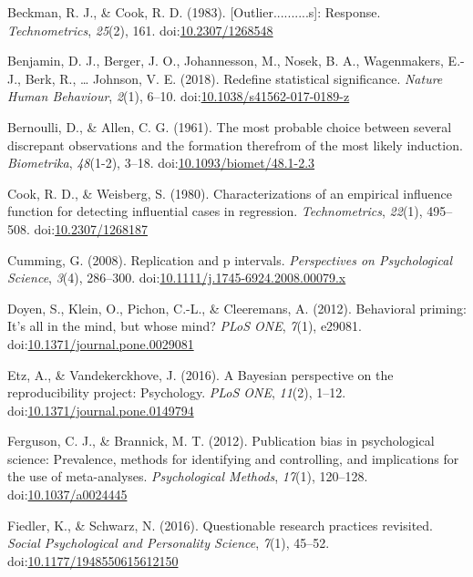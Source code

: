 \documentclass[english,man]{apa6}
\theoremstyle{definition}
\theoremstyle{definition}
\theoremstyle{definition}
\theoremstyle{remark}
\begin{document}
\hypertarget{ref-Beckman1983}{}
Beckman, R. J., \& Cook, R. D. (1983). {[}Outlier..........s{]}:
Response. \emph{Technometrics}, \emph{25}(2), 161.
doi:\href{https://doi.org/10.2307/1268548}{10.2307/1268548}

\hypertarget{ref-Benjamin2018}{}
Benjamin, D. J., Berger, J. O., Johannesson, M., Nosek, B. A.,
Wagenmakers, E.-J., Berk, R., \ldots{} Johnson, V. E. (2018). Redefine
statistical significance. \emph{Nature Human Behaviour}, \emph{2}(1),
6--10.
doi:\href{https://doi.org/10.1038/s41562-017-0189-z}{10.1038/s41562-017-0189-z}

\hypertarget{ref-Bernoulli1777}{}
Bernoulli, D., \& Allen, C. G. (1961). The most probable choice between
several discrepant observations and the formation therefrom of the most
likely induction. \emph{Biometrika}, \emph{48}(1-2), 3--18.
doi:\href{https://doi.org/10.1093/biomet/48.1-2.3}{10.1093/biomet/48.1-2.3}

\hypertarget{ref-Cook1980}{}
Cook, R. D., \& Weisberg, S. (1980). Characterizations of an empirical
influence function for detecting influential cases in regression.
\emph{Technometrics}, \emph{22}(1), 495--508.
doi:\href{https://doi.org/10.2307/1268187}{10.2307/1268187}

\hypertarget{ref-Cumming2008}{}
Cumming, G. (2008). Replication and p intervals. \emph{Perspectives on
Psychological Science}, \emph{3}(4), 286--300.
doi:\href{https://doi.org/10.1111/j.1745-6924.2008.00079.x}{10.1111/j.1745-6924.2008.00079.x}

\hypertarget{ref-Doyen2012}{}
Doyen, S., Klein, O., Pichon, C.-L., \& Cleeremans, A. (2012).
Behavioral priming: It's all in the mind, but whose mind? \emph{PLoS
ONE}, \emph{7}(1), e29081.
doi:\href{https://doi.org/10.1371/journal.pone.0029081}{10.1371/journal.pone.0029081}

\hypertarget{ref-Etz2016}{}
Etz, A., \& Vandekerckhove, J. (2016). A Bayesian perspective on the
reproducibility project: Psychology. \emph{PLoS ONE}, \emph{11}(2),
1--12.
doi:\href{https://doi.org/10.1371/journal.pone.0149794}{10.1371/journal.pone.0149794}

\hypertarget{ref-Ferguson2012a}{}
Ferguson, C. J., \& Brannick, M. T. (2012). Publication bias in
psychological science: Prevalence, methods for identifying and
controlling, and implications for the use of meta-analyses.
\emph{Psychological Methods}, \emph{17}(1), 120--128.
doi:\href{https://doi.org/10.1037/a0024445}{10.1037/a0024445}

\hypertarget{ref-Fiedler2016}{}
Fiedler, K., \& Schwarz, N. (2016). Questionable research practices
revisited. \emph{Social Psychological and Personality Science},
\emph{7}(1), 45--52.
doi:\href{https://doi.org/10.1177/1948550615612150}{10.1177/1948550615612150}
\end{document}
